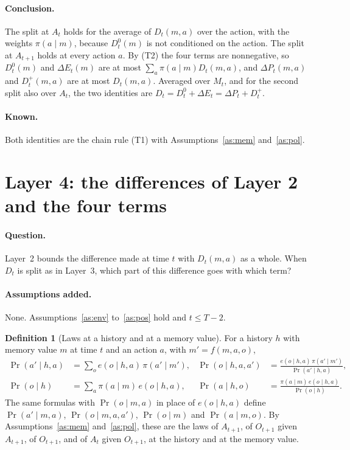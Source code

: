 \documentclass{article}
\theoremstyle{definition}
\newtheorem{definition}[proposition]{Definition}
\numberwithin{equation}{section}
\newcommand{\dE}{\Delta E}
\newcommand{\dP}{\Delta P}
\begin{document}
\paragraph{Conclusion.} The split at $A_t$ holds for the average of $D_t(m,a)$ over the action, with the weights $\pi(a\mid m)$, because $D^0_t(m)$ is not conditioned on the action. The split at $A_{t+1}$ holds at every action $a$. By (T2) the four terms are nonnegative, so $D^0_t(m)$ and $\dE_t(m)$ are at most $\sum_a\pi(a\mid m)D_t(m,a)$, and $\dP_t(m,a)$ and $D^+_t(m,a)$ are at most $D_t(m,a)$. Averaged over $M_t$, and for the second split also over $A_t$, the two identities are $D_t=D^0_t+\dE_t=\dP_t+D^+_t$.

\paragraph{Known.} Both identities are the chain rule (T1) with Assumptions~\ref{as:mem} and~\ref{as:pol}.

\section{Layer 4: the differences of Layer 2 and the four terms}\label{sec:layer4}

\paragraph{Question.} Layer~2 bounds the difference made at time $t$ with $D_t(m,a)$ as a whole. When $D_t$ is split as in Layer~3, which part of this difference goes with which term?

\paragraph{Assumptions added.} None. Assumptions~\ref{as:env} to~\ref{as:pos} hold and $t\le T-2$.

\begin{definition}[Laws at a history and at a memory value]\label{def:laws}
For a history $h$ with memory value $m$ at time $t$ and an action $a$, with $m'=f(m,a,o)$,
\begin{align*}
\Pr(a'\mid h,a)&=\sum_oe(o\mid h,a)\,\pi(a'\mid m'), &
\Pr(o\mid h,a,a')&=\frac{e(o\mid h,a)\,\pi(a'\mid m')}{\Pr(a'\mid h,a)},\\
\Pr(o\mid h)&=\sum_a\pi(a\mid m)\,e(o\mid h,a), &
\Pr(a\mid h,o)&=\frac{\pi(a\mid m)\,e(o\mid h,a)}{\Pr(o\mid h)}.
\end{align*}
The same formulas with $\Pr(o\mid m,a)$ in place of $e(o\mid h,a)$ define $\Pr(a'\mid m,a)$, $\Pr(o\mid m,a,a')$, $\Pr(o\mid m)$ and $\Pr(a\mid m,o)$. By Assumptions~\ref{as:mem} and~\ref{as:pol}, these are the laws of $A_{t+1}$, of $O_{t+1}$ given $A_{t+1}$, of $O_{t+1}$, and of $A_t$ given $O_{t+1}$, at the history and at the memory value.
\end{definition}
\end{document}
